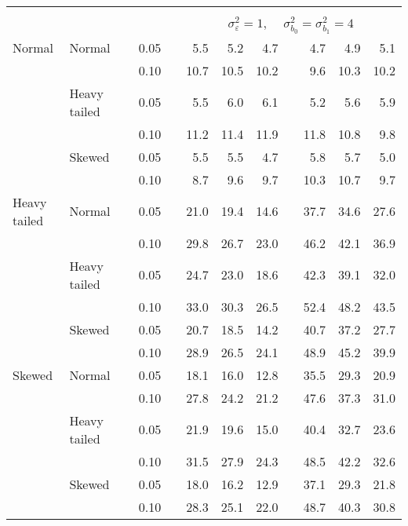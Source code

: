 \begin{table}[ht]
\begin{scriptsize}
\begin{center}
\begin{tabular}{ll p{.1cm} c p{.1cm} rrr p{.1cm} rrr}
&&&&&&&&&&&\\
& && && \multicolumn{7}{c}{$\sigma_{\varepsilon}^2 = 1$, \ \ $\sigma_{b_0}^2 = \sigma_{b_1}^2 = 4$} \\ \cline{6-12}
Normal       & Normal       && 0.05 &&   5.5 & 5.2 & 4.7 &   & 4.7 & 4.9 & 5.1 \\ 
             &              && 0.10 &&   10.7 & 10.5 & 10.2 &   & 9.6 & 10.3 & 10.2 \\ 
             & Heavy tailed && 0.05 &&   5.5 & 6.0 & 6.1 &   & 5.2 & 5.6 & 5.9 \\ 
             &              && 0.10 &&   11.2 & 11.4 & 11.9 &   & 11.8 & 10.8 & 9.8 \\ 
             & Skewed       && 0.05 &&   5.5 & 5.5 & 4.7 &   & 5.8 & 5.7 & 5.0 \\ 
             &              && 0.10 &&   8.7 & 9.6 & 9.7 &   & 10.3 & 10.7 & 9.7 \\ 
Heavy tailed & Normal       && 0.05 &&   21.0 & 19.4 & 14.6 &   & 37.7 & 34.6 & 27.6 \\ 
             &              && 0.10 &&   29.8 & 26.7 & 23.0 &   & 46.2 & 42.1 & 36.9 \\ 
             & Heavy tailed && 0.05 &&   24.7 & 23.0 & 18.6 &   & 42.3 & 39.1 & 32.0 \\ 
             &              && 0.10 &&   33.0 & 30.3 & 26.5 &   & 52.4 & 48.2 & 43.5 \\ 
             & Skewed       && 0.05 &&   20.7 & 18.5 & 14.2 &   & 40.7 & 37.2 & 27.7 \\ 
             &              && 0.10 &&   28.9 & 26.5 & 24.1 &   & 48.9 & 45.2 & 39.9 \\ 
Skewed       & Normal       && 0.05 &&   18.1 & 16.0 & 12.8 &   & 35.5 & 29.3 & 20.9 \\ 
             &              && 0.10 &&   27.8 & 24.2 & 21.2 &   & 47.6 & 37.3 & 31.0 \\ 
             & Heavy tailed && 0.05 &&   21.9 & 19.6 & 15.0 &   & 40.4 & 32.7 & 23.6 \\ 
             &              && 0.10 &&   31.5 & 27.9 & 24.3 &   & 48.5 & 42.2 & 32.6 \\ 
             & Skewed       && 0.05 &&   18.0 & 16.2 & 12.9 &   & 37.1 & 29.3 & 21.8 \\ 
             &              && 0.10 &&   28.3 & 25.1 & 22.0 &   & 48.7 & 40.3 & 30.8 \\ 

\hline
\end{tabular}
\end{center}
\end{scriptsize}
\end{table}

